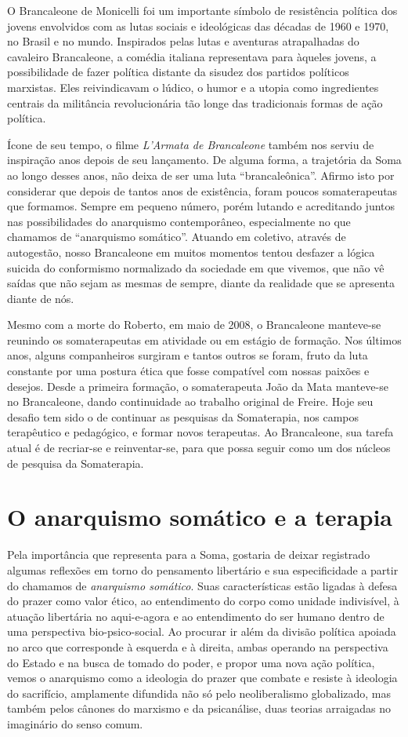 O Brancaleone de Monicelli foi um importante símbolo de resistência
política dos jovens envolvidos com as lutas sociais e ideológicas das
décadas de 1960 e 1970, no Brasil e no mundo. Inspirados pelas lutas e
aventuras atrapalhadas do cavaleiro Brancaleone, a comédia italiana
representava para àqueles jovens, a possibilidade de fazer política
distante da sisudez dos partidos políticos marxistas. Eles reivindicavam
o lúdico, o humor e a utopia como ingredientes centrais da militância
revolucionária tão longe das tradicionais formas de ação política.

Ícone de seu tempo, o filme \emph{L'Armata de Brancaleone} também nos
serviu de inspiração anos depois de seu lançamento. De alguma forma, a
trajetória da Soma ao longo desses anos, não deixa de ser uma luta
``brancaleônica''. Afirmo isto por considerar que depois de tantos anos
de existência, foram poucos somaterapeutas que formamos. Sempre em
pequeno número, porém lutando e acreditando juntos nas possibilidades do
anarquismo contemporâneo, especialmente no que chamamos de ``anarquismo
somático''. Atuando em coletivo, através de autogestão, nosso
Brancaleone em muitos momentos tentou desfazer a lógica suicida do
conformismo normalizado da sociedade em que vivemos, que não vê saídas
que não sejam as mesmas de sempre, diante da realidade que se apresenta
diante de nós.

Mesmo com a morte do Roberto, em maio de 2008, o Brancaleone manteve-se
reunindo os somaterapeutas em atividade ou em estágio de formação. Nos
últimos anos, alguns companheiros surgiram e tantos outros se foram,
fruto da luta constante por uma postura ética que fosse compatível com
nossas paixões e desejos. Desde a primeira formação, o somaterapeuta
João da Mata manteve-se no Brancaleone, dando continuidade ao trabalho
original de Freire. Hoje seu desafio tem sido o de continuar as
pesquisas da Somaterapia, nos campos terapêutico e pedagógico, e formar
novos terapeutas. Ao Brancaleone, sua tarefa atual é de recriar-se e
reinventar-se, para que possa seguir como um dos núcleos de pesquisa da
Somaterapia.

\section{O anarquismo somático e a terapia}

Pela importância que representa para a Soma, gostaria de deixar
registrado algumas reflexões em torno do pensamento libertário e sua
especificidade a partir do chamamos de \emph{anarquismo somático}. Suas
características estão ligadas à defesa do prazer como valor ético, ao
entendimento do corpo como unidade indivisível, à atuação libertária no
aqui-e-agora e ao entendimento do ser humano dentro de uma perspectiva
bio-psico-social. Ao procurar ir além da divisão política apoiada no
arco que corresponde à esquerda e à direita, ambas operando na
perspectiva do Estado e na busca de tomado do poder, e propor uma nova
ação política, vemos o anarquismo como a ideologia do prazer que combate
e resiste à ideologia do sacrifício, amplamente difundida não só pelo
neoliberalismo globalizado, mas também pelos cânones do marxismo e da
psicanálise, duas teorias arraigadas no imaginário do senso comum.

